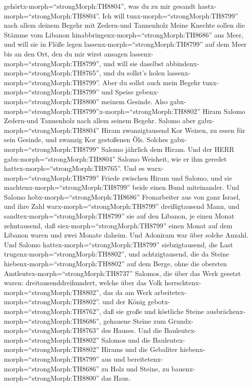 gehörtx-morph=``strongMorph:TH8804'', was du zu mir gesandt
hastx-morph=``strongMorph:TH8804''. Ich will
tunx-morph=``strongMorph:TH8799'' nach allem deinem Begehr mit
Zedern-und Tannenholz  Meine Knechte sollen die Stämme vom
Libanon hinabbringenx-morph=``strongMorph:TH8686'' ans Meer, und will
sie in Flöße legen lassenx-morph=``strongMorph:TH8799'' auf dem Meer bis
an den Ort, den du mir wirst ansagen
lassenx-morph=``strongMorph:TH8799'', und will sie daselbst
abbindenx-morph=``strongMorph:TH8765'', und du sollst's holen
lassenx-morph=``strongMorph:TH8799''. Aber du sollst auch mein Begehr
tunx-morph=``strongMorph:TH8799'' und Speise
gebenx-morph=``strongMorph:TH8800'' meinem Gesinde.  Also
gabx-morph=``strongMorph:TH8799''x-morph=``strongMorph:TH8802'' Hiram
Salomo Zedern-und Tannenholz nach allem seinem Begehr. 
Salomo aber gabx-morph=``strongMorph:TH8804'' Hiram zwanzigtausend Kor
Weizen, zu essen für sein Gesinde, und zwanzig Kor gestoßenen Öls.
Solches gabx-morph=``strongMorph:TH8799'' Salomo jährlich dem Hiram.
 Und der HERR gabx-morph=``strongMorph:TH8804'' Salomo
Weisheit, wie er ihm geredet hattex-morph=``strongMorph:TH8765''. Und es
warx-morph=``strongMorph:TH8799'' Friede zwischen Hiram und Salomo, und
sie machtenx-morph=``strongMorph:TH8799'' beide einen Bund miteinander.
 Und Salomo hobx-morph=``strongMorph:TH8686'' Fronarbeiter
aus von ganz Israel, und ihre Zahl warx-morph=``strongMorph:TH8799''
dreißigtausend Mann,  und
sandtex-morph=``strongMorph:TH8799'' sie auf den Libanon, je einen Monat
zehntausend, daß siex-morph=``strongMorph:TH8799'' einen Monat auf dem
Libanon waren und zwei Monate daheim. Und Adoniram war über solche
Anzahl.  Und Salomo hattex-morph=``strongMorph:TH8799''
siebzigtausend, die Last trugenx-morph=``strongMorph:TH8802'', und
achtzigtausend, die da Steine hiebenx-morph=``strongMorph:TH8802'' auf
dem Berge,  ohne die obersten
Amtleutex-morph=``strongMorph:TH8737'' Salomos, die über das Werk
gesetzt waren: dreitausenddreihundert, welche über das Volk
herrschtenx-morph=``strongMorph:TH8802'', das da am Werk
arbeitetex-morph=``strongMorph:TH8802''.  und der König
gebotx-morph=``strongMorph:TH8762'', daß sie große und köstliche Steine
ausbrächenx-morph=``strongMorph:TH8686'', gehauene Steine zum
Grundx-morph=``strongMorph:TH8763'' des Hauses.  Und die
Bauleutex-morph=``strongMorph:TH8802'' Salomos und die
Bauleutex-morph=``strongMorph:TH8802'' Hirams und die Gebaliter
hiebenx-morph=``strongMorph:TH8799'' aus und
bereitetenx-morph=``strongMorph:TH8686'' zu Holz und Steine, zu
bauenx-morph=``strongMorph:TH8800'' das Haus.

